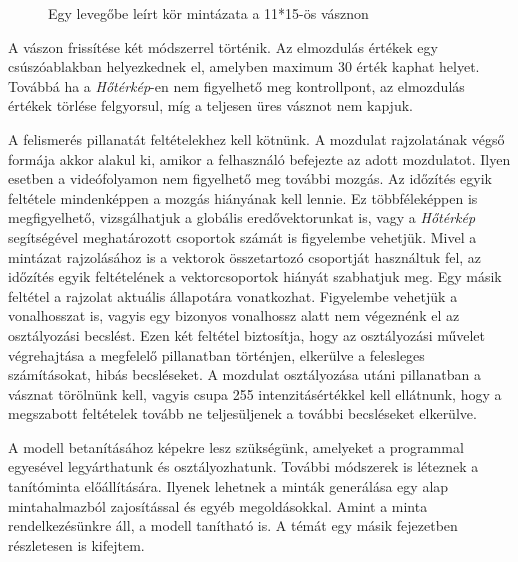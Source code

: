 \begin{figure}[h]
\centering
{}
\caption{Egy levegőbe leírt kör mintázata a 11*15-ös vásznon}
\label{fig:ocr-gesture}
\end{figure}

A vászon frissítése két módszerrel történik. Az elmozdulás értékek egy csúszóablakban helyezkednek el, amelyben maximum  30 érték kaphat helyet. Továbbá ha a \textit{Hőtérkép}-en nem figyelhető meg kontrollpont, az elmozdulás értékek törlése felgyorsul, míg a teljesen üres vásznot nem kapjuk.

A felismerés pillanatát feltételekhez kell kötnünk. A mozdulat rajzolatának végső formája akkor alakul ki, amikor a felhasználó befejezte az adott mozdulatot. Ilyen esetben a videófolyamon nem figyelhető meg további mozgás. Az időzítés egyik feltétele mindenképpen a mozgás hiányának kell lennie. Ez többféleképpen is megfigyelhető, vizsgálhatjuk a globális eredővektorunkat is, vagy a \textit{Hőtérkép} segítségével meghatározott csoportok számát is figyelembe vehetjük. Mivel a mintázat rajzolásához is a vektorok összetartozó csoportját használtuk fel, az időzítés egyik feltételének a vektorcsoportok hiányát szabhatjuk meg. Egy másik feltétel a rajzolat aktuális állapotára vonatkozhat. Figyelembe vehetjük a vonalhosszat is, vagyis egy bizonyos vonalhossz alatt nem végeznénk el az osztályozási becslést. Ezen két feltétel biztosítja, hogy az osztályozási művelet végrehajtása a megfelelő pillanatban történjen, elkerülve a felesleges számításokat, hibás becsléseket.
A mozdulat osztályozása utáni pillanatban a vásznat törölnünk kell, vagyis csupa 255 intenzitásértékkel kell ellátnunk, hogy a megszabott feltételek tovább ne teljesüljenek a további becsléseket elkerülve.

A modell betanításához képekre lesz szükségünk, amelyeket a programmal egyesével legyárthatunk és osztályozhatunk. További módszerek is léteznek a tanítóminta előállítására. Ilyenek lehetnek a minták generálása egy alap mintahalmazból zajosítással és egyéb megoldásokkal. Amint a minta rendelkezésünkre áll, a modell tanítható is. A témát egy másik fejezetben részletesen is kifejtem.
